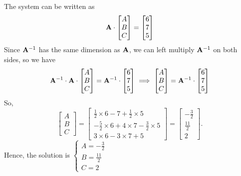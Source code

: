 \documentclass[12pt,a4paper]{article}
\begin{document}
\begin{solution}
The system can be written as
\[
\mathbf{A}
\cdot
\begin{bmatrix}
    A\\B\\C
\end{bmatrix}
=
\begin{bmatrix}
    6\\7\\5
\end{bmatrix}
\]
Since $\mathbf{A}^{-1}$ has the same dimension as $\mathbf{A}$, we can left multiply $\mathbf{A}^{-1}$ on both sides, so we have
\[
\mathbf{A}^{-1}
\cdot
\mathbf{A}
\cdot
\begin{bmatrix}
    A\\B\\C
\end{bmatrix}
=
\mathbf{A}^{-1}
\cdot
\begin{bmatrix}
    6\\7\\5
\end{bmatrix}
\implies
\begin{bmatrix}
    A\\B\\C
\end{bmatrix}
=
\mathbf{A}^{-1}
\cdot
\begin{bmatrix}
    6\\7\\5
\end{bmatrix}
\]
So,
\[
\begin{bmatrix}
    A\\B\\C
\end{bmatrix}
=
\begin{bmatrix}
    \frac{1}{2}\times 6 - 7 + \frac{1}{2}\times 5\\
    -\frac{5}{2}\times 6  + 4 \times 7 - \frac{3}{2}\times 5\\
    3\times 6 - 3\times 7 + 5
\end{bmatrix}
= 
\begin{bmatrix}
    -\frac{3}{2}\\
    \frac{11}{2}\\
    2
\end{bmatrix}.
\]
Hence, the solution is 
$\begin{cases}
    A = -\frac{3}{2}\\
    B =  \frac{11}{2}\\
    C = 2
\end{cases}$
\end{solution}
\end{document}
